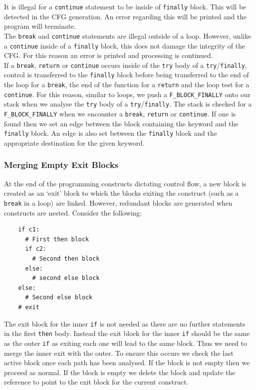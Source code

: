 \documentclass[12pt, titlepage]{article}
\begin{document}
\indent It is illegal for a \texttt{continue} statement to be inside of \texttt{finally} block. This will be detected in the CFG generation. An error regarding this will be printed and the program will terminate. \\
\indent The \texttt{break} and \texttt{continue} statements are illegal outside of a loop. However, unlike a \texttt{continue} inside of a \texttt{finally} block, this does not damage the integrity of the CFG. For this reason an error is printed and processing is continued. \\
\indent If a \texttt{break}, \texttt{return} or \texttt{continue} occurs inside of the \texttt{try} body of a \texttt{try}/\texttt{finally}, control is transferred to the \texttt{finally} block before being transferred to the end of the loop for a \texttt{break}, the end of the function for a \texttt{return} and the loop test for a \texttt{continue}. For this reason, similar to loops, we push a \texttt{F\_BLOCK\_FINALLY} onto our stack when we analyse the \texttt{try} body of a \texttt{try}/\texttt{finally}. The stack is checked for a \texttt{F\_BLOCK\_FINALLY} when we encounter a \texttt{break}, \texttt{return} or \texttt{continue}. If one is found then we set an edge between the block containing the keyword and the \texttt{finally} block. An edge is also set between the \texttt{finally} block and the appropriate destination for the given keyword.



\subsubsection{Merging Empty Exit Blocks}
At the end of the programming constructs dictating control flow, a new block is created as an `exit' block to which the blocks exiting the construct (such as a \texttt{break} in a loop) are linked. However, redundant blocks are generated when constructs are nested. Consider the following:
\begin{lstlisting}
    if c1:
      # First then block
      if c2:
        # Second then block
      else:
        # second else block
    else:
      # Second else block
    # exit
\end{lstlisting}
The exit block for the inner \texttt{if} is not needed as there are no further statements in the first \texttt{then} body. Instead the exit block for the inner \texttt{if} should be the same as the outer \texttt{if} as exiting each one will lead to the same block. Thus we need to merge the inner exit with the outer. To ensure this occurs we check the last active block once each path has been analysed. If the block is not empty then we proceed as normal. If the block is empty we delete the block and update the reference to point to the exit block for the current construct.
\end{document}
